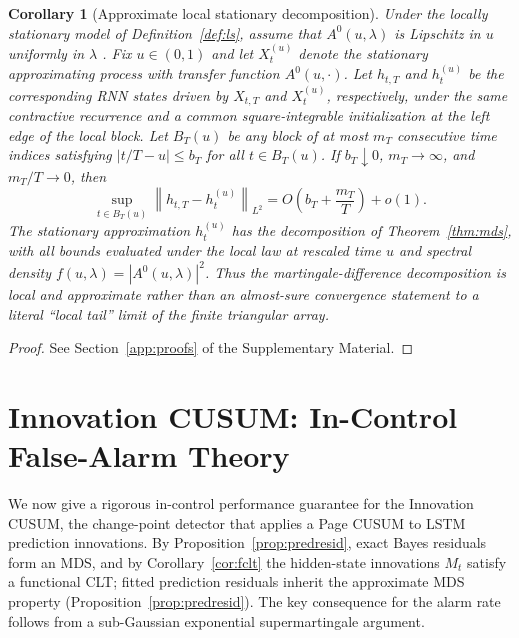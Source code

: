 \documentclass[bj,authoryear]{imsart}
\theoremstyle{plain}
\newtheorem{corollary}[theorem]{Corollary}
\theoremstyle{definition}
\newcommand{\norm}[1]{\left\lVert #1 \right\rVert}
\begin{document}
\begin{corollary}[Approximate local stationary decomposition]
\label{cor:ls}
  Under the locally stationary model of Definition~\ref{def:ls}, assume that
  $A^0(u,\lambda)$ is Lipschitz in $u$ uniformly in $\lambda$
  \citep[Assumption~2]{dahlhaus1997fitting}.  Fix $u\in(0,1)$ and let
  $X_t^{(u)}$ denote the stationary approximating process with transfer
  function $A^0(u,\cdot)$.  Let $h_{t,T}$ and $h_t^{(u)}$ be the corresponding
  RNN states driven by $X_{t,T}$ and $X_t^{(u)}$, respectively, under the same
  contractive recurrence and a common square-integrable initialization at the
  left edge of the local block.  Let $B_T(u)$ be any block of at most $m_T$
  consecutive time indices satisfying $|t/T-u|\leq b_T$ for all
  $t\in B_T(u)$.  If $b_T\downarrow0$, $m_T\to\infty$, and $m_T/T\to0$, then
  \begin{equation}
    \sup_{t\in B_T(u)}\norm{h_{t,T}-h_t^{(u)}}_{L^2}
    =O\!\left(b_T+\frac{m_T}{T}\right)+o(1).
    \label{eq:local-approx-bound}
  \end{equation}
  The stationary approximation $h_t^{(u)}$ has the decomposition of
  Theorem~\ref{thm:mds}, with all bounds evaluated under the local law at
  rescaled time $u$ and spectral density $f(u,\lambda)=|A^0(u,\lambda)|^2$.
  Thus the martingale-difference decomposition is local and approximate rather
  than an almost-sure convergence statement to a literal ``local tail'' limit
  of the finite triangular array.
\end{corollary}

\begin{proof}
  See Section~\ref{app:proofs} of the Supplementary Material.
\end{proof}


\section{Innovation CUSUM: In-Control False-Alarm Theory}
\label{sec:pathway}

We now give a rigorous in-control performance guarantee for the Innovation CUSUM, the
change-point detector that applies a Page CUSUM to LSTM prediction innovations.
By Proposition~\ref{prop:predresid}, exact Bayes residuals form an MDS, and
by Corollary~\ref{cor:fclt} the hidden-state innovations $M_t$ satisfy a
functional CLT; fitted prediction residuals inherit the approximate MDS
property (Proposition~\ref{prop:predresid}).  The key consequence for the
alarm rate follows from a sub-Gaussian exponential supermartingale argument.
\end{document}
